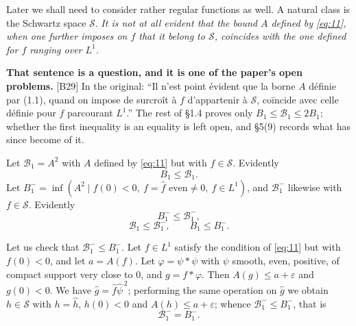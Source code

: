 \documentclass[11pt,reqno]{amsart}
\theoremstyle{plain}
\theoremstyle{definition}
\theoremstyle{remark}
\newcommand{\Ss}{\mathcal{S}}
\newcommand{\Bcal}{\mathcal{B}}
\newcommand{\fh}{\widehat{f}}
\newcommand{\Ledger}[1]{{\scriptsize\textsf{[#1]}}}
\begin{document}
Later we shall need to consider rather regular functions as well. A natural class is
the Schwartz space $\Ss$. \emph{It is not at all evident that the bound $A$ defined by
\eqref{eq:11}, when one further imposes on $f$ that it belong to $\Ss$, coincides with
the one defined for $f$ ranging over $L^1$.}

\begin{ournotation}
\textbf{That sentence is a question, and it is one of the paper's open problems.}
\Ledger{B29} In the original: ``Il n'est point \'evident que la borne $A$ d\'efinie par
(1.1), quand on impose de surcro\^it \`a $f$ d'appartenir \`a $\Ss$, co\"incide avec
celle d\'efinie pour $f$ parcourant $L^1$.'' The rest of \S1.4 proves only
$B_1\le\Bcal_1\le2B_1$; whether the first inequality is an equality is left open, and
\S5(9) records what has since become of it.
\end{ournotation}

Let $\Bcal_1=A^2$ with $A$ defined by \eqref{eq:11} but with $f\in\Ss$. Evidently
\begin{equation}\label{eq:12}
 B_1\le\Bcal_1 .
\end{equation}
Let $B_1^-=\inf(A^2\mid f(0)<0,\ f=\fh\text{ even}\ne0,\ f\in L^1)$, and $\Bcal_1^-$
likewise with $f\in\Ss$. Evidently
\begin{equation}\label{eq:13}
 B_1^-\le\Bcal_1^-,
\end{equation}
\begin{equation}\label{eq:14}
 \Bcal_1\le\Bcal_1^-,\qquad B_1\le B_1^- .
\end{equation}

Let us check that $\Bcal_1^-\le B_1^-$. Let $f\in L^1$ satisfy the condition of
\eqref{eq:11} but with $f(0)<0$, and let $a=A(f)$. Let $\varphi=\psi*\psi$ with $\psi$
smooth, even, positive, of compact support very close to $0$, and $g=f*\varphi$. Then
$A(g)\le a+\varepsilon$ and $g(0)<0$. We have $\widehat g=\fh\widehat\psi^{\,2}$;
performing the same operation on $\widehat g$ we obtain $h\in\Ss$ with $h=\widehat h$,
$h(0)<0$ and $A(h)\le a+\varepsilon$; whence $\Bcal_1^-\le B_1^-$, that is
\begin{equation}\label{eq:15}
 \Bcal_1^-=B_1^- .
\end{equation}
\end{document}
